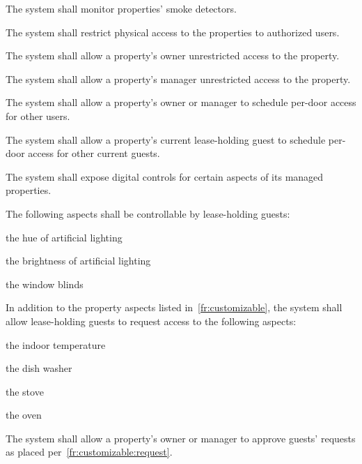 \documentclass[letter,titlepage,oneside,english]{report}
\begin{document}
\begin{fr}
\begin{fr}
\begin{fr}
    \end{fr}
  \item\label{fr:internal:smoke_detector}
    The system shall monitor properties' smoke detectors.
  \end{fr}
\item
  The system shall restrict physical access to the properties to authorized users.
  \begin{fr}
  \item
    The system shall allow a property's owner unrestricted access to the property.
  \item
    The system shall allow a property's manager unrestricted access to the property.
  \item
    The system shall allow a property's owner or manager to schedule per-door access for other users.
  \item
    The system shall allow a property's current lease-holding guest to schedule per-door access for other current guests.
  \end{fr}
\item\label{fr:controls}
  The system shall expose digital controls for certain aspects of its managed properties.
  \begin{fr}
  \item\label{fr:customizable}
    The following aspects shall be controllable by lease-holding guests:
    \begin{fr}
    \item
      the hue of artificial lighting
    \item
      the brightness of artificial lighting
    \item
      the window blinds
    \end{fr}
  \item\label{fr:customizable:request}
    In addition to the property aspects listed in~\ref{fr:customizable}, the system shall allow lease-holding guests to request access to the following aspects:
    \begin{fr}
    \item
      the indoor temperature
    \item
      the dish washer
    \item
      the stove
    \item
      the oven
    \end{fr}
  \item\label{fr:customizable:request_approve}
    The system shall allow a property's owner or manager to approve guests' requests as placed per~\ref{fr:customizable:request}.

\end{fr}
\end{fr}
\end{document}
